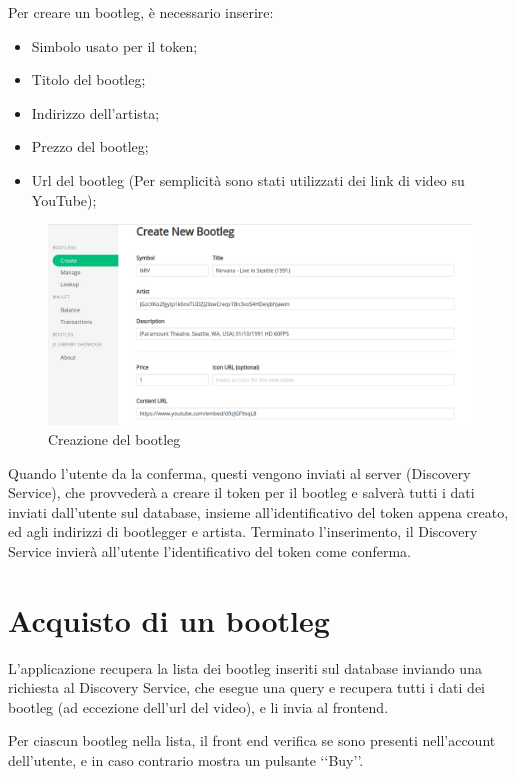 Per creare un bootleg, è necessario inserire:
\begin{itemize}
    \item Simbolo usato per il token;
    \item Titolo del bootleg;
    \item Indirizzo dell'artista;
    \item Prezzo del bootleg;
    \item Url del bootleg (Per semplicità sono stati utilizzati dei link di video su YouTube);
\end{itemize}

\begin{figure}[H]
    \includegraphics[width=\linewidth]{images/application/create-bootleg.png}
    \caption{Creazione del bootleg}
    \label{fig:bootleg_create}
\end{figure}

Quando l'utente da la conferma, questi vengono inviati al server (Discovery Service), che provvederà a creare il token per il bootleg e salverà tutti i dati inviati dall'utente sul database, insieme all'identificativo del token appena creato, ed agli indirizzi di bootlegger e artista. Terminato l'inserimento, il Discovery Service invierà all'utente l'identificativo del token come conferma.

\section{Acquisto di un bootleg}

L'applicazione recupera la lista dei bootleg inseriti sul database inviando una richiesta al Discovery Service, che esegue una query e recupera tutti i dati dei bootleg (ad eccezione dell'url del video), e li invia al frontend.

Per ciascun bootleg nella lista, il front end verifica se sono presenti nell'account dell'utente, e in caso contrario mostra un pulsante ‘‘Buy’’.

